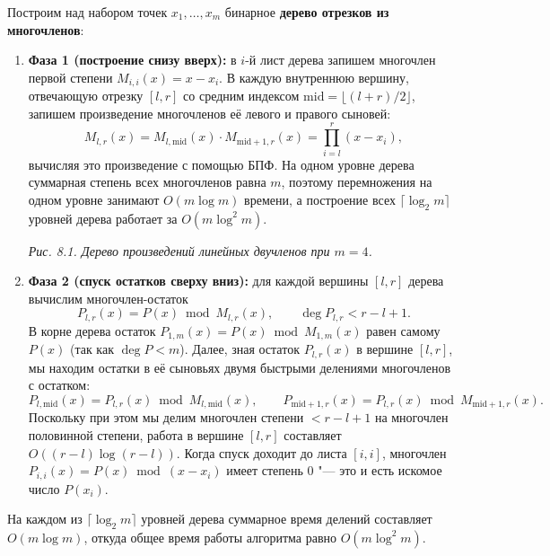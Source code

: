 Построим над набором точек $x_1, \dots, x_m$ бинарное \textbf{дерево отрезков из многочленов}:
\begin{enumerate}
    \item \textbf{Фаза 1 (построение снизу вверх):} в $i$-й лист дерева запишем многочлен первой степени $M_{i, i}(x) = x - x_i$. В каждую внутреннюю вершину, отвечающую отрезку $[l, r]$ со средним индексом $\text{mid} = \lfloor (l + r) / 2 \rfloor$, запишем произведение многочленов её левого и правого сыновей:
    \[
        M_{l, r}(x) = M_{l, \text{mid}}(x) \cdot M_{\text{mid}+1, r}(x) = \prod_{i=l}^r (x - x_i),
    \]
    вычисляя это произведение с помощью БПФ. На одном уровне дерева суммарная степень всех многочленов равна $m$, поэтому перемножения на одном уровне занимают $O(m \log m)$ времени, а построение всех $\lceil \log_2 m \rceil$ уровней дерева работает за $O(m \log^2 m)$.

    \begin{center}
    \par\nopagebreak\medskip
    \small\textit{Рис. 8.1. Дерево произведений линейных двучленов при $m = 4$.}
    \end{center}

    \item \textbf{Фаза 2 (спуск остатков сверху вниз):} для каждой вершины $[l, r]$ дерева вычислим многочлен-остаток
    \[
        P_{l, r}(x) = P(x) \bmod M_{l, r}(x), \qquad \deg P_{l, r} < r - l + 1.
    \]
    В корне дерева остаток $P_{1, m}(x) = P(x) \bmod M_{1, m}(x)$ равен самому $P(x)$ (так как $\deg P < m$). Далее, зная остаток $P_{l, r}(x)$ в вершине $[l, r]$, мы находим остатки в её сыновьях двумя быстрыми делениями многочленов с остатком:
    \[
        P_{l, \text{mid}}(x) = P_{l, r}(x) \bmod M_{l, \text{mid}}(x), \qquad P_{\text{mid}+1, r}(x) = P_{l, r}(x) \bmod M_{\text{mid}+1, r}(x).
    \]
    Поскольку при этом мы делим многочлен степени $< r - l + 1$ на многочлен половинной степени, работа в вершине $[l, r]$ составляет $O((r - l) \log(r - l))$. Когда спуск доходит до листа $[i, i]$, многочлен $P_{i, i}(x) = P(x) \bmod (x - x_i)$ имеет степень $0$ "--- это и есть искомое число $P(x_i)$.
\end{enumerate}
На каждом из $\lceil \log_2 m \rceil$ уровней дерева суммарное время делений составляет $O(m \log m)$, откуда общее время работы алгоритма равно $O(m \log^2 m)$.

